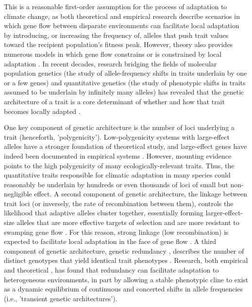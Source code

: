 \documentclass[9pt,twocolumn,twoside,lineno]{pnas-new}
\begin{document}
This is a reasonable first-order assumption
for the process of adaptation to climate change,
as both theoretical
\cite{aitken_whitlock,slatkin,tigano}
and empirical \cite{feder,bell} research describe scenarios in which
gene flow between disparate environments can facilitate local adaptation
by introducing, or increasing the frequency of, alleles 
that push trait values toward
the recipient population's fitness peak.
However, theory also provides numerous models
in which gene flow constrains or is constrained by
local adaptation
\cite{wang,lenormand,slatkin,haldane,wright,felsenstein}.
In recent decades, research bridging the fields
of molecular population genetics
(the study of allele-frequency shifts
in traits underlain by one or a few genes)
and quantitative genetics
(the study of phenotypic shifts in
traits assumed to be underlain by infinitely many alleles)
\cite{barghi_polygenic,barton,pritchard_human_adaptation,pritchard_sweeps_alone}
has revealed that the genetic architecture of a trait
is a core determinant of whether and how that trait
becomes locally adapted \cite{yeaman_review}. 

One key component of genetic architecture is the number of loci 
underlying a trait (henceforth, 'polygenicity'). 
Low-polygenicity systems with large-effect alleles
have a stronger foundation of theoretical study,
and large-effect genes have indeed been documented in empirical systems \cite{martin,rees}.
However, mounting evidence points to the high polygenicity 
of many ecologically-relevant traits\cite{boyle,rockman,savolainen,sella,barghi_polygenic}.
Thus, the quantitative traits responsible for climatic adaptation in many species could reasonably be 
underlain by hundreds or even thousands of loci of small but non-negligible effect.
A second component of genetic architecture, the linkage between trait loci
(or inversely, the rate of recombination between them),
controls the likelihood that adaptive alleles cluster together,
essentially forming larger-effect-size alleles that are more 
effective targets of selection and are more resistant
to swamping gene flow \cite{yeaman_whitlock}.
For this reason, strong linkage (low recombination)
is expected to facilitate local
adaptation in the face of gene flow \cite{tigano}.
A third component of genetic architecture,
genetic redundancy \cite{barghi_polygenic,laruson},
describes the number of distinct genotypes
that yield identical trait phenotypes \cite{yeaman_review,laruson,barghi_polygenic}.
Research, both empirical \cite{barghi_redundancy,manceau} and theoretical \cite{yeaman_amnat},
has found that redundancy can facilitate
adaptation to heterogeneous environments, in part by
allowing a stable phenotypic cline to exist as a dynamic equilibrium
of continuous and concerted shifts in allele frequencies
(i.e., 'transient genetic architectures').
\end{document}
